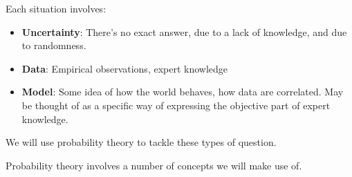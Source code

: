 \documentclass[a4paper]{article}
\begin{document}
            \begin{definition}
                Each situation involves:

                \begin{itemize}
                    \item \textbf{Uncertainty}: There's no exact answer, due to
                        a lack of knowledge, and due to randomness.
                    \item \textbf{Data}: Empirical observations, expert
                        knowledge
                    \item \textbf{Model}: Some idea of how the world behaves,
                        how data are correlated. May be thought of as a specific
                        way of expressing the objective part of expert
                        knowledge.
                \end{itemize}
            \end{definition}

            We will use probability theory to tackle these types of question.

            Probability theory involves a number of concepts we will make use
            of.
\end{document}
